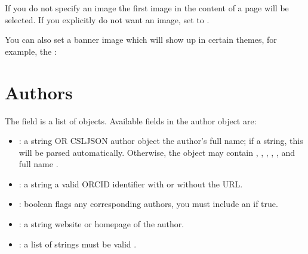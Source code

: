 \documentclass[letterpaper,12pt,english]{sphinxmanual}
\let\sphinxpxdimen\pdfpxdimen\else\newdimen\sphinxpxdimen
\begin{document}
\begin{sphinxVerbatim}[commandchars=\\\{\}]
\end{sphinxVerbatim}

\sphinxAtStartPar
If you do not specify an image the first image in the content of a page will be selected. If you explicitly do not want an image, set  to .

\sphinxAtStartPar
You can also set a banner image which will show up in certain themes, for example, the :

\begin{sphinxVerbatim}[commandchars=\\\{\}]
\end{sphinxVerbatim}

\sphinxAtStartPar
\sphinxincludegraphics[width=1872\sphinxpxdimen,height=1338\sphinxpxdimen]{{banner}.jpg}


\section{Authors}
\label{\detokenize{notebooks/02-myst.integration:authors}}
\sphinxAtStartPar
The  field is a list of  objects. Available fields in the author object are:
\begin{itemize}
\item {} 
\sphinxAtStartPar
{} : a string OR CSL\sphinxhyphen{}JSON author object \sphinxhyphen{} the author’s full name; if a string, this will be parsed automatically. Otherwise, the object may contain , , , , , and full name .

\item {} 
\sphinxAtStartPar
{} : a string \sphinxhyphen{} a valid ORCID identifier with or without the URL.

\item {} 
\sphinxAtStartPar
{} : boolean \sphinxhyphen{} flags any corresponding authors, you must include an  if true.

\item {} 
\sphinxAtStartPar
{} : a string \sphinxhyphen{} website or homepage of the author.

\item {} 
\sphinxAtStartPar
{} : a list of strings \sphinxhyphen{} must be valid .

\end{itemize}
\end{document}
